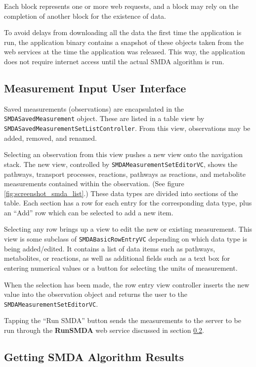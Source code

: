Each block represents one or more web requests, and a block may rely on the
completion of another block for the existence of data.

To avoid delays from downloading all the data the first time the application is
run, the application binary contains a snapshot of these objects taken from the
web services at the time the application was released. This way, the application
does not require internet access until the actual SMDA algorithm is run.

\subsection{Measurement Input User Interface}
\label{sect:smda_results_ui}

Saved measurements (observations) are encapsulated in the
\texttt{SMDASavedMeasurement} object. These are listed in a table view by
\texttt{SMDASavedMeasurementSetListController}. From this view, observations may
be added, removed, and renamed.

Selecting an observation from this view pushes a new view onto the navigation
stack. The new view, controlled by \texttt{SMDAMeasurementSetEditorVC}, shows
the pathways, transport processes, reactions, pathways as reactions, and
metabolite measurements contained within the observation. (See figure
\ref{fig:screenshot_smda_list}.) These data types are divided into sections of
the table. Each section has a row for each entry for the corresponding data
type, plus an ``Add'' row which can be selected to add a new item.

Selecting any row brings up a view to edit the new or existing measurement. This
view is some subclass of \texttt{SMDABasicRowEntryVC} depending on which data
type is being added/edited. It contains a list of data items such as pathways,
metabolites, or reactions, as well as additional fields such as a text box for
entering numerical values or a button for selecting the units of measurement.

When the selection has been made, the row entry view controller inserts the new
value into the observation object and returns the user to the
\texttt{SMDAMeasurementSetEditorVC}.

Tapping the ``Run SMDA'' button sends the measurements to the \pathcasemaw
server to be run through the \textbf{RunSMDA} web service discussed in section
\ref{sect:smda_results_request}.

\subsection{Getting SMDA Algorithm Results}
\label{sect:smda_results_request}

